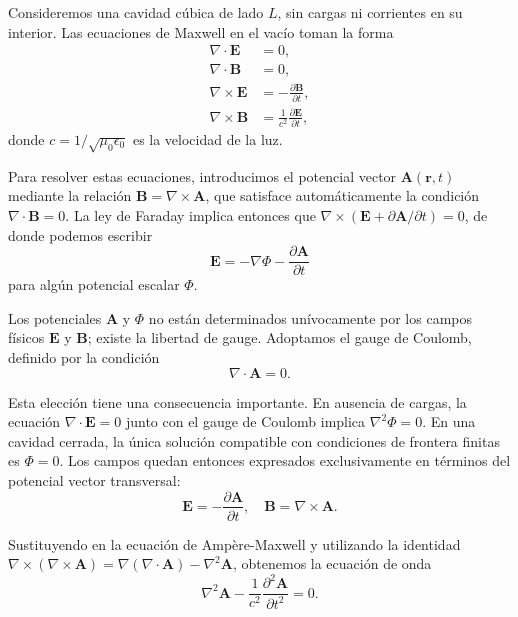         Consideremos una cavidad cúbica de lado $L$, sin cargas ni corrientes en su interior. Las ecuaciones de Maxwell en el vacío toman la forma \cite{Jackson1999}
        \begin{align}
            \nabla \cdot \mathbf{E} &= 0, \\
            \nabla \cdot \mathbf{B} &= 0, \\
            \nabla \times \mathbf{E} &= -\frac{\partial \mathbf{B}}{\partial t}, \\
            \nabla \times \mathbf{B} &= \frac{1}{c^2}\frac{\partial \mathbf{E}}{\partial t},
        \end{align}
        donde $c = 1/\sqrt{\mu_0 \epsilon_0}$ es la velocidad de la luz.
        
        Para resolver estas ecuaciones, introducimos el potencial vector $\mathbf{A}(\mathbf{r}, t)$ mediante la relación $\mathbf{B} = \nabla \times \mathbf{A}$, que satisface automáticamente la condición $\nabla \cdot \mathbf{B} = 0$. La ley de Faraday implica entonces que $\nabla \times (\mathbf{E} + \partial\mathbf{A}/\partial t) = 0$, de donde podemos escribir
        \begin{equation}
            \mathbf{E} = -\nabla \Phi - \frac{\partial \mathbf{A}}{\partial t}
        \end{equation}
        para algún potencial escalar $\Phi$.
        
        Los potenciales $\mathbf{A}$ y $\Phi$ no están determinados unívocamente por los campos físicos $\mathbf{E}$ y $\mathbf{B}$; existe la libertad de gauge. Adoptamos el gauge de Coulomb, definido por la condición
        \begin{equation}
            \nabla \cdot \mathbf{A} = 0.
        \end{equation}
        
        Esta elección tiene una consecuencia importante. En ausencia de cargas, la ecuación $\nabla \cdot \mathbf{E} = 0$ junto con el gauge de Coulomb implica $\nabla^2 \Phi = 0$. En una cavidad cerrada, la única solución compatible con condiciones de frontera finitas es $\Phi = 0$. Los campos quedan entonces expresados exclusivamente en términos del potencial vector transversal:
        \begin{equation}
            \mathbf{E} = -\frac{\partial \mathbf{A}}{\partial t}, \quad \mathbf{B} = \nabla \times \mathbf{A}.
        \end{equation}
        
        Sustituyendo en la ecuación de Ampère-Maxwell y utilizando la identidad $\nabla \times (\nabla \times \mathbf{A}) = \nabla(\nabla \cdot \mathbf{A}) - \nabla^2 \mathbf{A}$, obtenemos la ecuación de onda
        \begin{equation}
            \nabla^2 \mathbf{A} - \frac{1}{c^2}\frac{\partial^2 \mathbf{A}}{\partial t^2} = 0.
        \end{equation}

